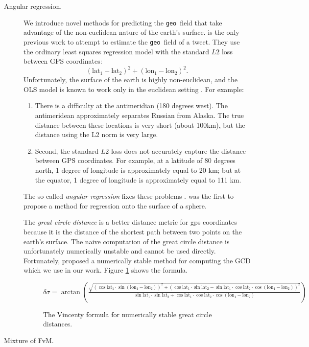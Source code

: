 \documentclass[sigconf,anonymous,review,10pt]{acmart}
\newcommand{\tweetdata}[1]{{\texttt{#1}~}}
\newcommand{\geo          }{\tweetdata{geo}}
\newcommand{\lata}{\text{lat}_1}
\newcommand{\latb}{\text{lat}_2}
\newcommand{\latd}{(\lata-\latb)}
\newcommand{\lona}{\text{lon}_1}
\newcommand{\lonb}{\text{lon}_2}
\newcommand{\lond}{(\lona-\lonb)}
\begin{document}
{\begin{description}
\item[Angular regression.]
We introduce novel methods for predicting the \geo field that take advantage of the non-euclidean nature of the earth's surface.
\citet{duong2016near} is the only previous work to attempt to estimate the \geo field of a tweet.
They use the ordinary least squares regression model with the standard $L2$ loss between GPS coordinates:
\begin{equation}
    \latd^2 + \lond^2
    .
\end{equation}
Unfortunately, the surface of the earth is highly non-euclidean, 
and the OLS model is known to work only in the euclidean setting \citep[e.g.][]{fisher1992regression}.
For example:
\begin{enumerate}
    \item
        There is a difficulty at the antimeridian (180 degrees west).
        The antimeridean approximately separates Russian from Alaska.
        The true distance between these locations is very short (about 100km),
        but the distance using the L2 norm is very large.
    \item
        Second, the standard $L2$ loss does not accurately capture the distance between GPS coordinates.
        For example, at a latitude of 80 degrees north, 1 degree of longitude is approximately equal to 20 km;
        but at the equator, 1 degree of longitude is approximately equal to 111 km.
\end{enumerate}

The so-called \emph{angular regression} fixes these problems \citep{fisher1992regression}.
\citet{fisher1992regression} was the first to propose a method for regression onto the surface of a sphere.

The \emph{great circle distance} is a better distance metric for gps coordinates because it is the distance of the shortest path between two points on the earth's surface.
The naive computation of the great circle distance is unfortunately numerically unstable and cannot be used directly.
Fortunately, \citet{vincenty1975direct} proposed a numerically stable method for computing the GCD which we use in our work.
Figure \ref{fig:vincenty} shows the formula.

\begin{figure}
    \centering
    $
    \displaystyle
        \delta\sigma 
        =
        \arctan\left(
            \frac
            {\sqrt{(\cos\lata\cdot\sin\lond)^2 + (\cos\lata\cdot\sin\latb-\sin\lata\cdot\cos\latb\cdot\cos\lond)^2}}
            {\sin\lata\cdot\sin\latb + \cos\lata\cdot\cos\latb\cdot\cos\lond}
        \right)
    $
    \caption{The Vincenty formula for numerically stable great circle distances.}
    \label{fig:vincenty}
\end{figure}

\item[Mixture of FvM.]

\end{description}
}
\end{document}
